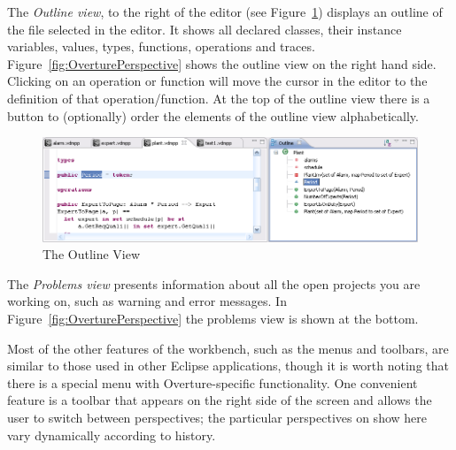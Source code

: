 

The \emph{Outline view}, to the right of the editor (see
Figure~\ref{fig:OutlineView}) displays an outline of the file selected
in the editor. It shows all declared classes, their instance variables,
values, types, functions, operations and traces.
Figure~\ref{fig:OverturePerspective} shows the outline view on the
right hand side. Clicking on an operation or function will move the
cursor in the editor to the definition of that operation/function. At
the top of the outline view there is a button to (optionally) order
the elements of the outline view alphabetically.

\begin{figure}[!htb]
\begin{center}
  \includegraphics[width=4.5in]{figures/OutlineView}
  \caption[labelInTOC]{The Outline View}
  \label{fig:OutlineView}
\end{center}
\end{figure}

The \emph{Problems view} presents information about all the open projects you
are working on, such as warning and error messages. In
Figure~\ref{fig:OverturePerspective} the problems view is shown at the bottom.

Most of the other features of the workbench, such as the menus and
toolbars, are similar to those used in other Eclipse applications,
though it is worth noting that there is a special menu with
Overture-specific functionality. One convenient feature is a toolbar
that appears on the right side of the screen and allows the user to
switch between perspectives; the particular perspectives on show here
vary dynamically according to history.



